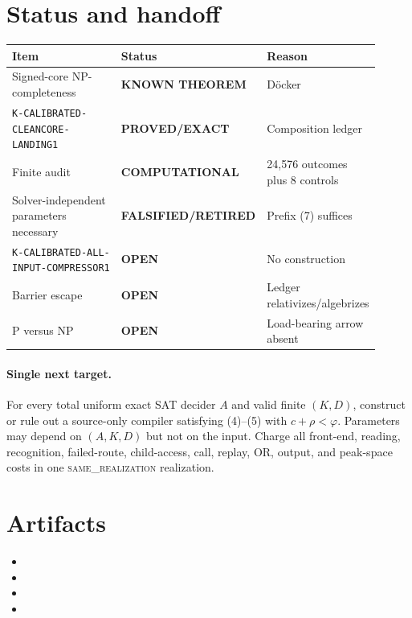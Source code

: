 \documentclass[11pt]{article}
\newcommand{\EXACT}{\textbf{PROVED/EXACT}}
\newcommand{\KNOWN}{\textbf{KNOWN THEOREM}}
\newcommand{\COMP}{\textbf{COMPUTATIONAL}}
\newcommand{\OPEN}{\textbf{OPEN}}
\newcommand{\RETIRED}{\textbf{FALSIFIED/RETIRED}}
\newcommand{\same}{\textsc{same\_realization}}
\begin{document}
\section{Status and handoff}
\begin{center}
\begin{tabular}{p{0.45\linewidth}p{0.18\linewidth}p{0.28\linewidth}}
\toprule Item & Status & Reason\\ \midrule
Signed-core NP-completeness & \KNOWN & D\"ocker\\
\texttt{K-CALIBRATED-CLEANCORE-LANDING1} & \EXACT & Composition ledger\\
Finite audit & \COMP & 24,576 outcomes plus 8 controls\\
Solver-independent parameters necessary & \RETIRED & Prefix (7) suffices\\
\texttt{K-CALIBRATED-ALL-INPUT-COMPRESSOR1} & \OPEN & No construction\\
Barrier escape & \OPEN & Ledger relativizes/algebrizes\\
P versus NP & \OPEN & Load-bearing arrow absent\\
\bottomrule
\end{tabular}
\end{center}

\paragraph{Single next target.}
For every total uniform exact SAT decider $A$ and valid finite $(K,D)$,
construct or rule out a source-only compiler satisfying (4)--(5) with
$c+\rho<\varphi$. Parameters may depend on $(A,K,D)$ but not on the input.
Charge all front-end, reading, recognition, failed-route, child-access, call,
replay, OR, output, and peak-space costs in one \same{} realization.

\section{Artifacts}
\begin{itemize}
\item {}
\item {}
\item {}
\item {}
\end{itemize}
\end{document}
